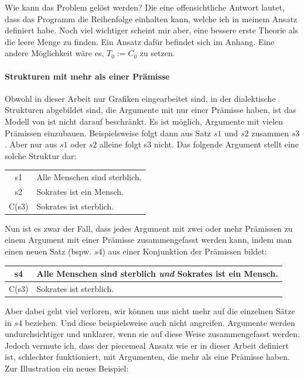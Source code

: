 \documentclass{article}
\begin{document}
Wie kann das Problem gelöst werden? Die eine offensichtliche Antwort lautet, dass das Programm die Reihenfolge einhalten kann, welche ich in meinem Ansatz definiert habe. Noch viel wichtiger scheint mir aber, eine bessere erste Theorie als die leere Menge zu finden. Ein Ansatz dafür befindet sich im Anhang. Eine andere Möglichkeit wäre es, $T_0 := C_0$ zu setzen.

\paragraph{Strukturen mit mehr als einer Prämisse}
Obwohl in dieser Arbeit nur Grafiken eingearbeitet sind, in der dialektische Strukturen abgebildet sind, die Argumente mit nur einer Prämisse haben, ist das Modell von \citeauthor{beisbart_making_2021} ist nicht darauf beschränkt. Es ist möglich, Argumente mit vielen Prämissen einzubauen. Beispielsweise folgt dann aus Satz $s1$ und $s2$ zusammen $s3$. Aber nur aus $s1$ oder $s2$ alleine folgt s3 nicht. Das folgende Argument stellt eine solche Struktur dar:

\begin{center}
\begin{tabular}{c p{9cm}}
s1 & Alle Menschen sind sterblich.\\
s2 & Sokrates ist ein Mensch.\\\hline
C(s3) & Sokrates ist sterblich. 
\end{tabular}
\end{center}

Nun ist es zwar der Fall, dass jedes Argument mit zwei oder mehr Prämissen zu einem Argument mit einer Prämisse zusammengefasst werden kann, indem man einen neuen Satz (bspw. $s4$) aus einer Konjunktion der Prämissen bildet:

\begin{center}
\begin{tabular}{c p{9cm}}
s4 & Alle Menschen sind sterblich \textit{und} Sokrates ist ein Mensch.\\\hline
C(s3) & Sokrates ist sterblich. 
\end{tabular}
\end{center}

Aber dabei geht viel verloren, wir können uns nicht mehr auf die einzelnen Sätze in $s4$ beziehen. Und diese beispielsweise auch nicht angreifen. Argumente werden undurchsichtiger und unklarer, wenn sie auf diese Weise zusammengefasst werden.
Jedoch vermute ich, dass der piecemeal Ansatz wie er in dieser Arbeit definiert ist, schlechter funktioniert, mit Argumenten, die mehr als eine Prämisse haben. Zur Illustration ein neues Beispiel:
\end{document}
